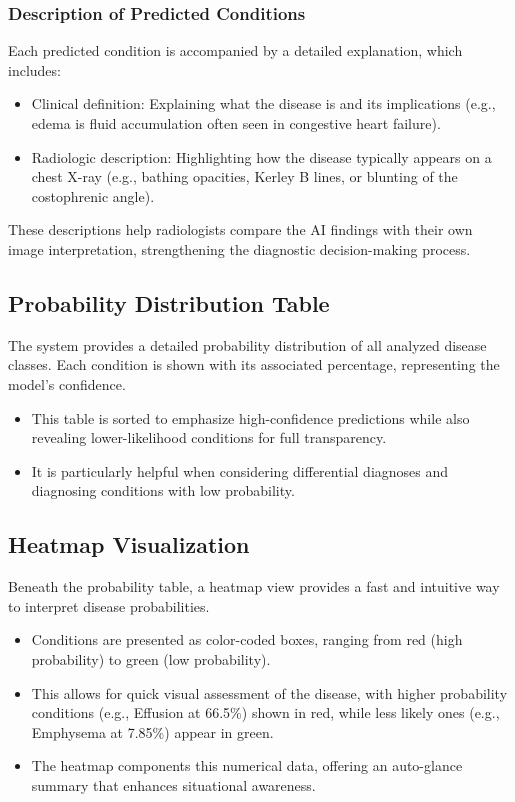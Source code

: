 \documentclass[12pt]{article}
\begin{document}
\subsubsection*{Description of Predicted Conditions}

Each predicted condition is accompanied by a detailed explanation, which includes:

\begin{itemize}
    \item Clinical definition: Explaining what the disease is and its implications (e.g., edema is fluid accumulation often seen in congestive heart failure).
    \item Radiologic description: Highlighting how the disease typically appears on a chest X-ray (e.g., bathing opacities, Kerley B lines, or blunting of the costophrenic angle).
\end{itemize}

These descriptions help radiologists compare the AI findings with their own image interpretation, strengthening the diagnostic decision-making process.

\subsection{Probability Distribution Table}

The system provides a detailed probability distribution of all analyzed disease classes. Each condition is shown with its associated percentage, representing the model's confidence.

\begin{itemize}
    \item This table is sorted to emphasize high-confidence predictions while also revealing lower-likelihood conditions for full transparency.
    \item It is particularly helpful when considering differential diagnoses and diagnosing conditions with low probability.
\end{itemize}

\subsection{Heatmap Visualization}

Beneath the probability table, a heatmap view provides a fast and intuitive way to interpret disease probabilities.

\begin{itemize}
    \item Conditions are presented as color-coded boxes, ranging from red (high probability) to green (low probability).
    \item This allows for quick visual assessment of the disease, with higher probability conditions (e.g., Effusion at 66.5\%) shown in red, while less likely ones (e.g., Emphysema at 7.85\%) appear in green.
    \item The heatmap components this numerical data, offering an auto-glance summary that enhances situational awareness.
\end{itemize}
\end{document}
